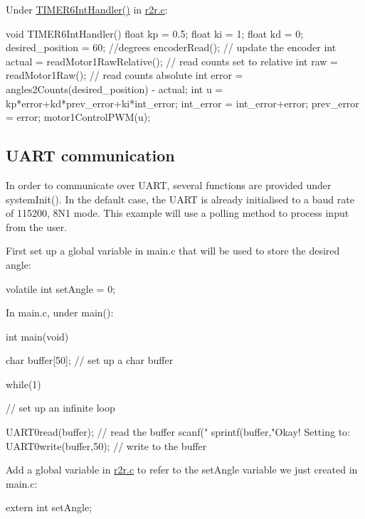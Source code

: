 Under {\ttfamily \mbox{\hyperlink{r2r_8h_a57b21594b75d4b2a140a1f9bbb1465e8}{T\+I\+M\+E\+R6\+Int\+Handler()}}} in {\ttfamily \mbox{\hyperlink{r2r_8c}{r2r.\+c}}}\+: \begin{DoxyVerb}void TIMER6IntHandler(){
    float kp = 0.5;
    float ki = 1;
    float kd = 0;
    desired_position = 60; //degrees
    encoderRead(); // update the encoder
    int actual = readMotor1RawRelative(); // read counts set to relative
    int raw = readMotor1Raw(); // read counts absolute
    int error = angles2Counts(desired_position) - actual;
    int u = kp*error+kd*prev_error+ki*int_error;
     int_error = int_error+error;
     prev_error = error;
    motor1ControlPWM(u);
 }  
\end{DoxyVerb}
\hypertarget{index_communication}{}\subsection{U\+A\+R\+T communication}\label{index_communication}
In order to communicate over U\+A\+RT, several functions are provided under {\ttfamily system\+Init()}. In the default case, the U\+A\+RT is already initialised to a baud rate of 115200, 8\+N1 mode. This example will use a polling method to process input from the user.

First set up a global variable in {\ttfamily main.\+c} that will be used to store the desired angle\+: \begin{DoxyVerb}volatile int setAngle = 0;
\end{DoxyVerb}


In {\ttfamily main.\+c}, under {\ttfamily main()}\+: \begin{DoxyVerb}    int main(void){
    char buffer[50]; // set up a char buffer

    while(1){ // set up an infinite loop

        UART0read(buffer); // read the buffer
        scanf("%
        sprintf(buffer,"Okay! Setting to: %
        UART0write(buffer,50); // write to the buffer

    }   
}
\end{DoxyVerb}


Add a global variable in {\ttfamily \mbox{\hyperlink{r2r_8c}{r2r.\+c}}} to refer to the set\+Angle variable we just created in main.\+c\+: \begin{DoxyVerb}    extern int setAngle;
\end{DoxyVerb}


